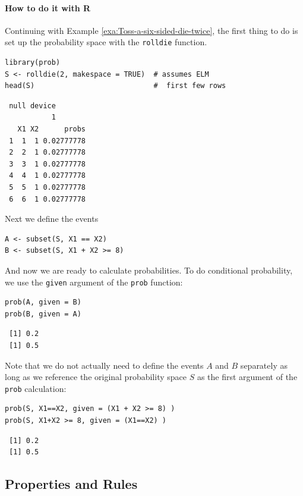 \documentclass[captions=tableheading]{scrbook}
\begin{document}
\paragraph*{How to do it with \textsf{R}}

Continuing with Example \ref{exa:Toss-a-six-sided-die-twice}, the first thing to do is set up the probability space with the \texttt{rolldie} function.


\begin{verbatim}
library(prob)
S <- rolldie(2, makespace = TRUE)  # assumes ELM
head(S)                            #  first few rows
\end{verbatim}

\begin{verbatim}
 null device 
           1
   X1 X2      probs
 1  1  1 0.02777778
 2  2  1 0.02777778
 3  3  1 0.02777778
 4  4  1 0.02777778
 5  5  1 0.02777778
 6  6  1 0.02777778
\end{verbatim}

Next we define the events


\begin{verbatim}
A <- subset(S, X1 == X2)
B <- subset(S, X1 + X2 >= 8)
\end{verbatim}

And now we are ready to calculate probabilities. To do conditional probability, we use the \texttt{given} argument of the \texttt{prob} function:


\begin{verbatim}
prob(A, given = B)
prob(B, given = A)
\end{verbatim}

\begin{verbatim}
 [1] 0.2
 [1] 0.5
\end{verbatim}

Note that we do not actually need to define the events \(A\) and \(B\) separately as long as we reference the original probability space \(S\) as the first argument of the \texttt{prob} calculation:


\begin{verbatim}
prob(S, X1==X2, given = (X1 + X2 >= 8) )
prob(S, X1+X2 >= 8, given = (X1==X2) )
\end{verbatim}

\begin{verbatim}
 [1] 0.2
 [1] 0.5
\end{verbatim}
\subsection{Properties and Rules}
\label{sec-4-6-1}
\end{document}
